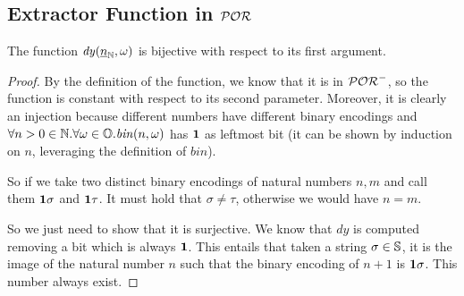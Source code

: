 











































\subsection{Extractor Function in $\mathcal{POR}$}



\begin{lemma}
  \label{lemma:dyadbij}
  The function $\mathit{dy}({\underline {n}}_{\mathbb{N}}, \omega)$ is bijective with respect to its first argument.
\end{lemma}
\begin{proof}
  By the definition of the function, we know that it is in $\mathcal{POR}^-$, so
  the function is constant with respect to its second parameter. Moreover,
  it is clearly an injection because different numbers have different binary encodings
  and $\forall n>0 \in \mathbb{N}.\forall \omega \in \mathbb{O}. \mathit{bin}(n,\omega)$ has $\mathbf{1}$
  as leftmost bit
  (it can be shown by induction on $n$, leveraging the definition of $\mathit{bin}$).


  So if we take two distinct binary encodings of natural numbers $n, m$ and call them $\mathbf{1}\sigma$ and $\mathbf{1}\tau$.
  It must hold that $\sigma \neq \tau$, otherwise we would have $n=m$.

  So we just need to show that it is surjective. We know that $\mathit{dy}$
  is computed removing a bit which is always $\mathbf{1}$.
  This entails that taken a string $\sigma \in \mathbb{S}$,
  it is the image of the natural number $n$ such that
  the binary encoding of $n+1$ is $\mathbf{1} \sigma$. This number always exist.
\end{proof}

